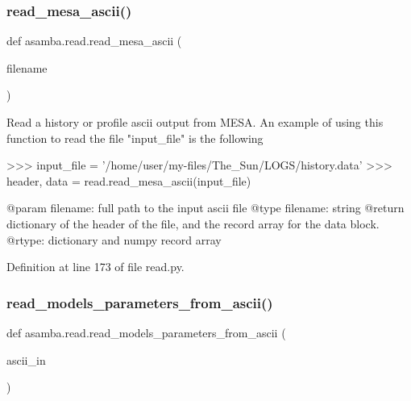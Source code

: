 \mbox{\label{namespaceasamba_1_1read_ae83b875713bb96212678b765231b4687}} 
\subsubsection{\texorpdfstring{read\+\_\+mesa\+\_\+ascii()}{read\_mesa\_ascii()}}
{\footnotesize\ttfamily def asamba.\+read.\+read\+\_\+mesa\+\_\+ascii (\begin{DoxyParamCaption}\item[{}]{filename }\end{DoxyParamCaption})}

\begin{DoxyVerb}Read a history or profile ascii output from MESA.
An example of using this function to read the file "input_file" is the following

>>> input_file = '/home/user/my-files/The_Sun/LOGS/history.data'
>>> header, data = read.read_mesa_ascii(input_file)

@param filename: full path to the input ascii file
@type filename: string
@return dictionary of the header of the file, and the record array for the data block. 
@rtype: dictionary and numpy record array
\end{DoxyVerb}
 

Definition at line 173 of file read.\+py.

\mbox{\label{namespaceasamba_1_1read_abb755ca6d69a403b2cbdc28d54eb0e24}} 
\subsubsection{\texorpdfstring{read\+\_\+models\+\_\+parameters\+\_\+from\+\_\+ascii()}{read\_models\_parameters\_from\_ascii()}}
{\footnotesize\ttfamily def asamba.\+read.\+read\+\_\+models\+\_\+parameters\+\_\+from\+\_\+ascii (\begin{DoxyParamCaption}\item[{}]{ascii\+\_\+in }\end{DoxyParamCaption})}


